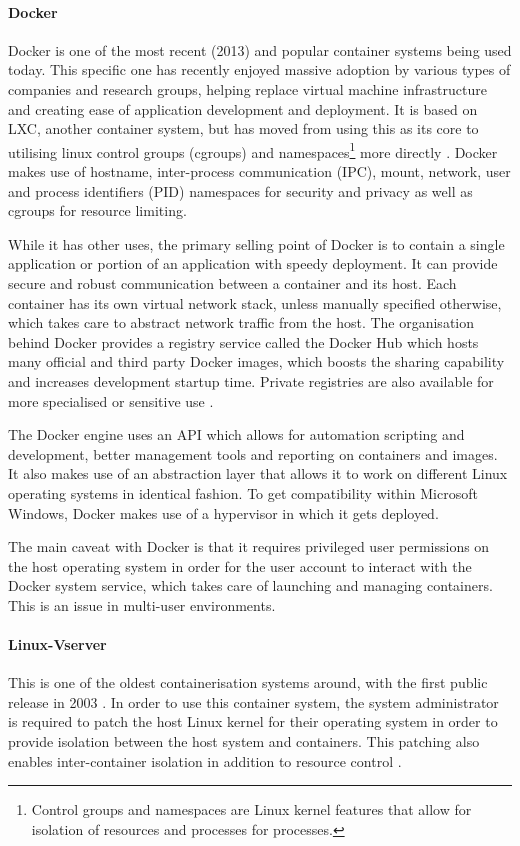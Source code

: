 \paragraph{Docker} \label{container:docker}
Docker is one of the most recent (2013) and popular container systems being used today. This specific one has recently enjoyed massive adoption by various types of companies and research groups, helping replace virtual machine infrastructure and creating ease of application development and deployment. It is based on LXC, another container system, but has moved from using this as its core to utilising linux control groups (cgroups) and namespaces\footnote{Control groups and namespaces are Linux kernel features that allow for isolation of resources and processes for processes.} more directly \parencite{merkel2014docker}. Docker makes use of hostname, inter-process communication (IPC), mount, network, user and process identifiers (PID) namespaces \parencite{bui2015analysis} for security and privacy as well as cgroups for resource limiting.

While it has other uses, the primary selling point of Docker is to contain a single application or portion of an application with speedy deployment. It can provide secure and robust communication between a container and its host. Each container has its own virtual network stack, unless manually specified otherwise, which takes care to abstract network traffic from the host. The organisation behind Docker provides a registry service called the Docker Hub which hosts many official and third party Docker images, which boosts the sharing capability and increases development startup time. Private registries are also available for more specialised or sensitive use \parencite{boettiger2015introduction}.

The Docker engine uses an API which allows for automation scripting and development, better management tools and reporting on containers and images. It also makes use of an abstraction layer that allows it to work on different Linux operating systems in identical fashion. To get compatibility within Microsoft Windows, Docker makes use of a hypervisor in which it gets deployed.

The main caveat with Docker is that it requires privileged user permissions on the host operating system in order for the user account to interact with the Docker system service, which takes care of launching and managing containers. This is an issue in multi-user environments.

\paragraph{Linux-Vserver} 
This is one of the oldest containerisation systems around, with the first public release in 2003 \citep{linuxvserver}. In order to use this container system, the system administrator is required to patch the host Linux kernel for their operating system in order to provide isolation between the host system and containers. This patching also enables inter-container isolation in addition to resource control \parencite{quetier2007scalability}.

